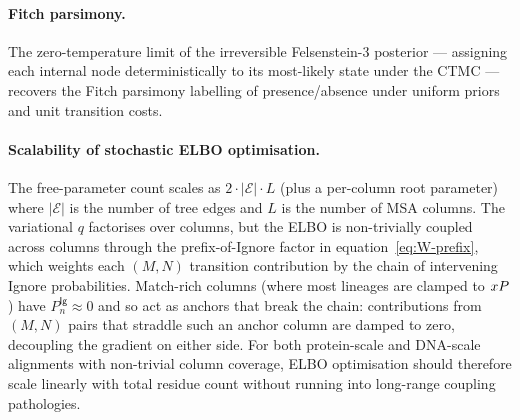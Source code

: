 \paragraph{Fitch parsimony.}
The zero-temperature limit of the irreversible Felsenstein-3
posterior — assigning each internal node deterministically to its
most-likely state under the CTMC — recovers the Fitch parsimony
labelling of presence/absence under uniform priors and unit
transition costs.

\paragraph{Scalability of stochastic ELBO optimisation.}
The free-parameter count scales as $2 \cdot |\mathcal{E}| \cdot L$
(plus a per-column root parameter)
where $|\mathcal{E}|$ is the number of tree edges and $L$ is the
number of MSA columns.
The variational $q$ factorises over columns, but the ELBO is
non-trivially coupled across columns through the prefix-of-Ignore
factor in equation~\eqref{eq:W-prefix}, which weights each
$(M, N)$ transition contribution by the chain of intervening Ignore
probabilities.
Match-rich columns (where most lineages are clamped to $x{P}$)
have $P_n^{\mathsf{Ig}} \approx 0$ and so act as anchors that break
the chain: contributions from $(M, N)$ pairs that straddle such an
anchor column are damped to zero, decoupling the gradient on either
side.
For both protein-scale and DNA-scale alignments with non-trivial
column coverage, ELBO optimisation should therefore scale linearly
with total residue count without running into long-range coupling
pathologies.
